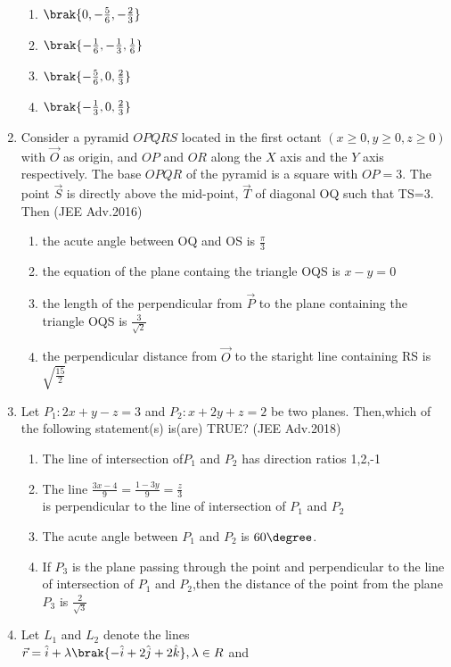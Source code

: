 \begin{enumerate}
		\begin{enumerate}
			\item $\brak{0,-\frac{5}{6},-\frac{2}{3}}$
			\item $\brak{-\frac{1}{6},-\frac{1}{3},\frac{1}{6}}$
			\item $\brak{-\frac{5}{6},0,\frac{2}{3}}$
			\item $\brak{-\frac{1}{3},0,\frac{2}{3}}$
		\end{enumerate}
	\item Consider a pyramid $OPQRS$ located in the first octant $(x\geq 0,y\geq 0,z\geq 0)$ with $\vec{O}$ as origin, and $OP$ and $OR$ along the $X$ axis and the $Y$ axis respectively. The base $OPQR$ of the pyramid is
		a square with $OP=3$. The point $\vec{S}$ is directly above the mid-point, $\vec{T}$ of diagonal OQ such that TS=3. Then \hfill{(JEE Adv.2016)}
		\begin{enumerate}
			\item the acute angle between OQ and OS is $\frac{\pi}{3}$
			\item the equation of the plane containg the triangle OQS is $x-y=0$
			\item the length of the perpendicular from $\vec{P}$ to the plane containing the triangle OQS is $\frac{3}{\sqrt{2}}$
			\item the perpendicular distance from $\vec{O}$ to the staright line containing RS is $\sqrt{\frac{15}{2}}$
		\end{enumerate}
	\item Let $P_1:2x+y-z=3$ and $P_2:x+2y+z=2$ be two planes. Then,which of the following statement(s) is(are) TRUE? \hfill{(JEE Adv.2018)}
		\begin{enumerate}
			\item The line of intersection of$P_1$ and $P_2$ has direction ratios 1,2,-1
			\item The line $\frac{3x-4}{9}=\frac{1-3y}{9}=\frac{z}{3}$ \\ is perpendicular to the line of intersection of $P_1$ and $P_2$
			\item The acute angle between $P_1$ and $P_2$ is $60\degree$.
			\item If $P_3$ is the plane passing through the point  and perpendicular to the line of intersection of $P_1$ and $P_2$,then the distance of the point 
				from the plane $P_3$ is $\frac{2}{\sqrt{3}}$
		\end{enumerate}
	\item Let $L_1$ and $L_2$ denote the lines\\ $\vec{r}=\hat{i}+\lambda\brak{-\hat{i}+2\hat{j}+2\hat{k}}, \lambda \in R$ and \\

\end{enumerate}
